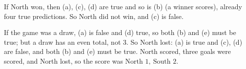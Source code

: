 If North won, then (a), (c), (d) are true and so is (b) (a winner scores), already four true predictions. So North did not win, and (c) is false.

If the game was a draw, (a) is false and (d) true, so both (b) and (e) must be true; but a draw has an even total, not $3$. So North lost: (a) is true and (c), (d) are false, and both (b) and (e) must be true. North scored, three goals were scored, and North lost, so the score was $\boxed{\text{North }1,\ \text{South }2}$.
